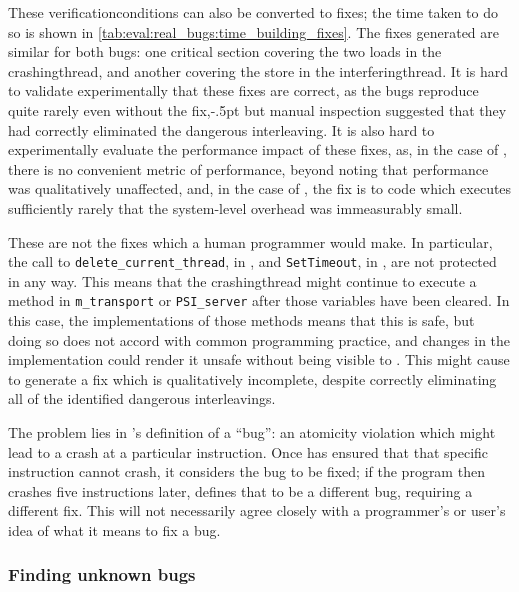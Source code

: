 \noindent
These \glspl{verificationcondition} can also be converted to fixes;
the time taken to do so is shown in
\autoref{tab:eval:real_bugs:time_building_fixes}.  The fixes generated
are similar for both bugs: one critical section covering the two loads
in the \gls{crashingthread}, and another covering the store in the
\gls{interferingthread}.  It is hard to validate experimentally that
these fixes are correct, as the bugs reproduce quite rarely even
without the fix,\kern-.5pt but
manual inspection suggested that they had correctly eliminated the
dangerous interleaving.  It is also hard to experimentally evaluate
the performance impact of these fixes, as, in the case of
, there is no convenient metric of performance,
beyond noting that performance was qualitatively unaffected, and, in
the case of , the fix is to code which executes
sufficiently rarely that the system-level overhead was immeasurably
small.

These are not the fixes which a human programmer would make.  In
particular, the call to \texttt{delete\_current\_thread}, in
, and \texttt{SetTimeout}, in ,
are not protected in any way.  This means that the
\gls{crashingthread} might continue to execute a method in
\texttt{m\_transport} or \texttt{PSI\_server} after those variables
have been cleared.  In this case, the implementations of those methods
means that this is safe, but doing so does not accord with common
programming practice, and changes in the implementation could render
it unsafe without being visible to {\technique}.  This might cause
{\technique} to generate a fix which is qualitatively incomplete,
despite correctly eliminating all of the identified dangerous
interleavings.

The problem lies in {\technique}'s definition of a ``bug'': an
atomicity violation which might lead to a crash at a particular
instruction.  Once {\technique} has ensured that that specific
instruction cannot crash, it considers the bug to be fixed; if the
program then crashes five instructions later, {\technique} defines
that to be a different bug, requiring a different fix.  This will not
necessarily agree closely with a programmer's or user's idea of what
it means to fix a bug.

\subsubsection{Finding unknown bugs}
\label{sect:how:finding_unknown}

